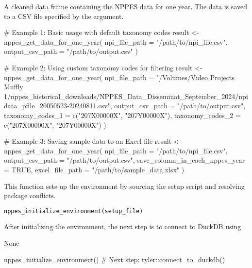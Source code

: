 \documentclass[a4paper]{book}
\begin{document}
%
\begin{Value}
A cleaned data frame containing the NPPES data for one year. The data is saved to a CSV file
specified by the  argument.
\end{Value}
%
\begin{Examples}
\begin{ExampleCode}
# Example 1: Basic usage with default taxonomy codes
result <- nppes_get_data_for_one_year(
  npi_file_path = "/path/to/npi_file.csv",
  output_csv_path = "/path/to/output.csv"
)

# Example 2: Using custom taxonomy codes for filtering
result <- nppes_get_data_for_one_year(
  npi_file_path = "/Volumes/Video Projects Muffly 1/nppes_historical_downloads/NPPES_Data_Disseminat_September_2024/npidata_pfile_20050523-20240811.csv",
  output_csv_path = "/path/to/output.csv",
  taxonomy_codes_1 = c("207X00000X", "207Y00000X"),
  taxonomy_codes_2 = c("207X00000X", "207Y00000X")
)

# Example 3: Saving sample data to an Excel file
result <- nppes_get_data_for_one_year(
  npi_file_path = "/path/to/npi_file.csv",
  output_csv_path = "/path/to/output.csv",
  save_column_in_each_nppes_year = TRUE,
  excel_file_path = "/path/to/sample_data.xlsx"
)

\end{ExampleCode}
\end{Examples}
%
\begin{Description}
This function sets up the environment by sourcing the setup script and resolving package conflicts.
\end{Description}
%
\begin{Usage}
\begin{verbatim}
nppes_initialize_environment(setup_file)
\end{verbatim}
\end{Usage}
%
\begin{Details}
After initializing the environment, the next step is to connect to DuckDB using .
\end{Details}
%
\begin{Value}
None
\end{Value}
%
\begin{Examples}
\begin{ExampleCode}
nppes_initialize_environment()
# Next step: tyler::connect_to_duckdb()
\end{ExampleCode}
\end{Examples}
\end{document}
